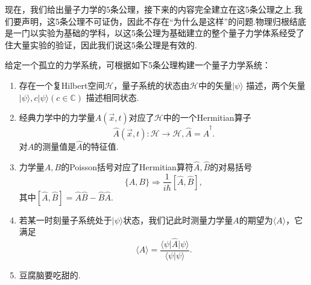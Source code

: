 		现在，我们给出量子力学的5条公理，接下来的内容完全建立在这5条公理之上.我们要声明，这5条公理不可证伪，因此不存在“为什么是这样”的问题.物理归根结底是一门以实验为基础的学科，以这5条公理为基础建立的整个量子力学体系经受了住大量实验的验证，因此我们说这5条公理是有效的.
		\begin{definition}
			给定一个孤立的力学系统，可根据如下5条公理构建一个量子力学系统：
			\begin{enumerate}
				\item 存在一个复Hilbert空间$\mathcal{H}$，量子系统的状态由$\mathcal{H}$中的矢量$\vert\psi\rangle$	描述，两个矢量$\vert\psi\rangle ,c\vert\psi\rangle(c\in\mathbb{C})$	描述相同状态.		
				\item 经典力学中的力学量$A(\overrightarrow{x} ,t)$对应了$\mathcal{H}$中的一个Hermitian算子
				$$\hat{A}(\overrightarrow{x} ,t):\mathcal{H}\rightarrow \mathcal{H},\hat{A}=\hat{A}^\dagger.$$
				对$A$的测量值是$\hat{A}$的特征值.
				\item 力学量$A,B$的Poisson括号对应了Hermitian算符$\hat{A},\hat{B}$的对易括号
				$$\{A,B\}\Rightarrow\frac{1}{i\hbar}[\hat{A},\hat{B}],$$
				其中$[\hat{A},\hat{B}]=\hat{A}\hat{B}-\hat{B}\hat{A}$.
				\item 若某一时刻量子系统处于$\vert\psi\rangle$状态，我们记此时测量力学量$A$的期望为$\langle A\rangle$，它满足
				$$\langle A\rangle =\frac{\langle\psi\vert\hat{A}\vert\psi\rangle}{\langle\psi\vert\psi\rangle}.$$
				\item 豆腐脑要吃甜的.
			\end{enumerate}
		\end{definition}
